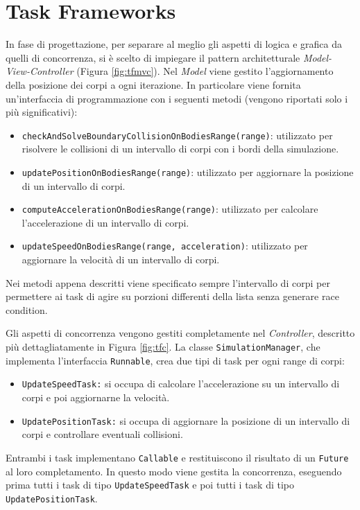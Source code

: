 \documentclass[12pt,a4paper,openright,twoside]{book}
\begin{document}
\section{Task Frameworks}
In fase di progettazione, per separare al meglio gli aspetti di logica e grafica da quelli di concorrenza, si è scelto di impiegare il pattern architetturale \textit{Model-View-Controller} (Figura \ref{fig:tfmvc}).
Nel \textit{Model} viene gestito l'aggiornamento della posizione dei corpi a ogni iterazione. In particolare viene fornita 
un'interfaccia di programmazione con i seguenti metodi (vengono riportati solo i più significativi):
\begin{itemize}
	\item \texttt{checkAndSolveBoundaryCollisionOnBodiesRange(range)}: 
	utilizzato per risolvere le collisioni di un intervallo di corpi con i bordi della simulazione.
	\item \texttt{updatePositionOnBodiesRange(range)}:
	utilizzato per aggiornare la posizione di un intervallo di corpi.
	\item \texttt{computeAccelerationOnBodiesRange(range)}:
	utilizzato per calcolare l'accelerazione di un intervallo di corpi.
	\item \texttt{updateSpeedOnBodiesRange(range, acceleration)}:
	utilizzato per aggiornare la velocità di un intervallo di corpi.
\end{itemize}
Nei metodi appena descritti viene specificato sempre l'intervallo di corpi per permettere ai task di agire su porzioni differenti della lista senza generare race condition.

Gli aspetti di concorrenza vengono gestiti completamente nel \textit{Controller},
descritto più dettagliatamente in Figura \ref{fig:tfc}.
La classe \texttt{SimulationManager}, che implementa l'interfaccia \texttt{Runnable}, crea due tipi di task per ogni range di corpi:
\begin{itemize}
    \item \texttt{UpdateSpeedTask:} si occupa di calcolare l'accelerazione su un intervallo di corpi e poi aggiornarne la velocità.
    \item \texttt{UpdatePositionTask:} si occupa di aggiornare la posizione di un intervallo di corpi e controllare eventuali collisioni.
\end{itemize}
Entrambi i task implementano \texttt{Callable} e restituiscono il risultato di un \texttt{Future} al loro completamento. In questo modo viene gestita la concorrenza, eseguendo prima tutti i task di tipo \texttt{UpdateSpeedTask} e poi tutti i task di tipo \texttt{UpdatePositionTask}.
\end{document}
